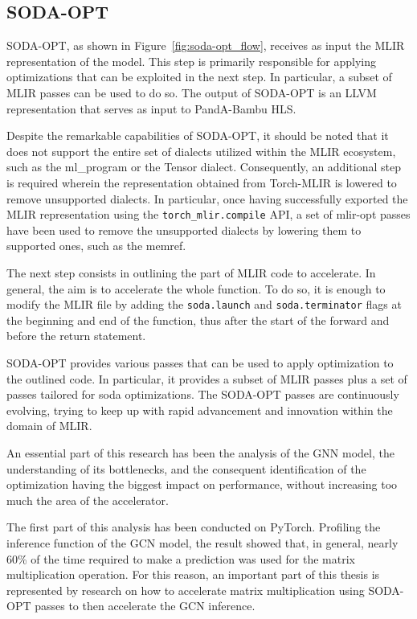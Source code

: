 \subsection{SODA-OPT}
\label{subsec:toolchain-soda_opt}%

SODA-OPT, as shown in Figure~\ref{fig:soda-opt_flow}, receives as input the MLIR representation of the model.
This step is primarily responsible for applying optimizations that can be exploited in the next step.
In particular, a subset of MLIR passes can be used to do so.
The output of SODA-OPT is an LLVM representation that serves as input to PandA-Bambu HLS\@.

Despite the remarkable capabilities of SODA-OPT, it should be noted that it does not support the entire set of dialects utilized within the MLIR ecosystem, such as the ml\_program or the Tensor dialect.
Consequently, an additional step is required wherein the representation obtained from Torch-MLIR is lowered to remove unsupported dialects.
In particular, once having successfully exported the MLIR representation using the \lstinline{torch_mlir.compile} API, a set of mlir-opt passes have been used to remove the unsupported dialects by lowering them to supported ones, such as the memref.

The next step consists in outlining the part of MLIR code to accelerate.
In general, the aim is to accelerate the whole function.
To do so, it is enough to modify the MLIR file by adding the \lstinline{soda.launch} and \lstinline{soda.terminator} flags at the beginning and end of the function, thus after the start of the forward and before the return statement.

SODA-OPT provides various passes that can be used to apply optimization to the outlined code.
In particular, it provides a subset of MLIR passes plus a set of passes tailored for soda optimizations.
The SODA-OPT passes are continuously evolving, trying to keep up with rapid advancement and innovation within the domain of MLIR\@.

An essential part of this research has been the analysis of the GNN model, the understanding of its bottlenecks, and the consequent identification of the optimization having the biggest impact on performance, without increasing too much the area of the accelerator.

The first part of this analysis has been conducted on PyTorch.
Profiling the inference function of the GCN model, the result showed that, in general, nearly 60\% of the time required to make a prediction was used for the matrix multiplication operation.
For this reason, an important part of this thesis is represented by research on how to accelerate matrix multiplication using SODA-OPT passes to then accelerate the GCN inference.

